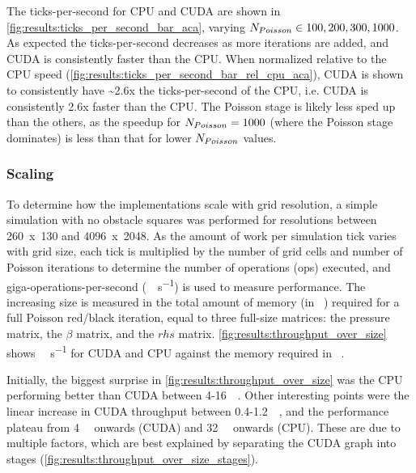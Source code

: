 


The ticks-per-second for CPU and CUDA are shown in \cref{fig:results:ticks_per_second_bar_aca}, varying $N_{Poisson} \in {100, 200, 300, 1000}$.
As expected the ticks-per-second decreases as more iterations are added, and CUDA is consistently faster than the CPU.
When normalized relative to the CPU speed (\cref{fig:results:ticks_per_second_bar_rel_cpu_aca}), CUDA is shown to consistently have \textasciitilde{}2.6x the ticks-per-second of the CPU, i.e. CUDA is consistently 2.6x faster than the CPU. 
The Poisson stage is likely less sped up than the others, as the speedup for $N_{Poisson}{} = 1000$ (where the Poisson stage dominates) is less than that for lower $N_{Poisson}{}$ values.

\subsubsection{Scaling}
To determine how the implementations scale with grid resolution, a simple simulation with no obstacle squares was performed for resolutions between 260~x~130 and 4096~x~2048.
As the amount of work per simulation tick varies with grid size, each tick is multiplied by the number of grid cells and number of Poisson iterations to determine the number of operations (\si{op}s) executed, and giga-operations-per-second (\si{\giga\op\per\second}) is used to measure performance.
The increasing size is measured in the total amount of memory (in \si{\mega\byte}) required for a full Poisson red/black iteration, equal to three full-size matrices: the pressure matrix, the $\beta$ matrix, and the $rhs$ matrix.
\cref{fig:results:throughput_over_size} shows \si{\giga\op\per\second} for CUDA and CPU against the memory required in \si{\mega\byte}.



Initially, the biggest surprise in \cref{fig:results:throughput_over_size} was the CPU performing better than CUDA between 4-\SI{16}{\mega\byte}.
Other interesting points were the linear increase in CUDA throughput between 0.4-\SI{1.2}{\mega\byte}, and the performance plateau from \SI{4}{\mega\byte} onwards (CUDA) and \SI{32}{\mega\byte} onwards (CPU).
These are due to multiple factors, which are best explained by separating the CUDA graph into stages (\cref{fig:results:throughput_over_size_stages}).

